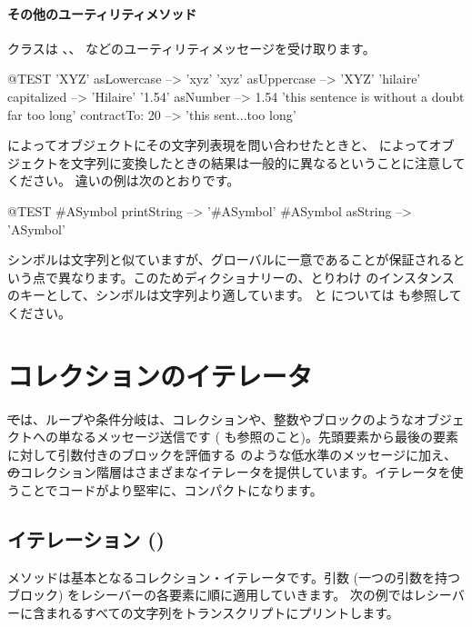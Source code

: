 \documentclass[a4paper,10pt,twoside]{book}
\begin{document}
\paragraph{その他のユーティリティメソッド}
 クラスは 、、 などのユーティリティメッセージを受け取ります。

\begin{code}{@TEST}
'XYZ' asLowercase --> 'xyz'
'xyz' asUppercase   --> 'XYZ'
'hilaire' capitalized   --> 'Hilaire'
'1.54' asNumber      --> 1.54
'this sentence is without a doubt far too long' contractTo: 20 --> 'this sent...too long'
\end{code}

 によってオブジェクトにその文字列表現を問い合わせたときと、 によってオブジェクトを文字列に変換したときの結果は一般的に異なるということに注意してください。
違いの例は次のとおりです。

\begin{code}{@TEST}
#ASymbol printString --> '#ASymbol'
#ASymbol asString    --> 'ASymbol'
\end{code}

シンボルは文字列と似ていますが、グローバルに一意であることが保証されるという点で異なります。このためディクショナリーの、とりわけ  のインスタンスのキーとして、シンボルは文字列より適しています。
 と  については  も参照してください。

\section{コレクションのイテレータ}

\st では、ループや条件分岐は、コレクションや、整数やブロックのようなオブジェクトへの単なるメッセージ送信です ( も参照のこと)。先頭要素から最後の要素に対して引数付きのブロックを評価する  のような低水準のメッセージに加え、\st のコレクション階層はさまざまなイテレータを提供しています。イテレータを使うことでコードがより堅牢に、コンパクトになります。

\subsection{イテレーション ()}
 メソッドは基本となるコレクション・イテレータです。引数 (一つの引数を持つブロック) をレシーバーの各要素に順に適用していきます。
次の例ではレシーバーに含まれるすべての文字列をトランスクリプトにプリントします。
\end{document}
